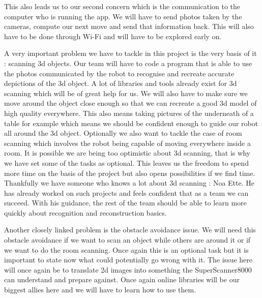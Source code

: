 \documentclass{article}
\begin{document}
This also leads us to our second concern which is the communication to the computer who is running the app. We will have to send photos taken by the cameras, compute our next move and send that information back. This will also have to be done through Wi-Fi and will have to be explored early on.

A very important problem we have to tackle in this project is the very basis of it : scanning 3d objects. Our team will have to code a program that is able to use the photos communicated by the robot to recognise and recreate accurate depictions of the 3d object. A lot of libraries and tools already exist for 3d scanning which will be of great help for us. We will also have to make sure we move around the object close enough so that we can recreate a good 3d model of high quality everywhere. This also means taking pictures of the underneath of a table for example which means we should be confident enough to guide our robot all around the 3d object. Optionally we also want to tackle the case of room scanning which involves the robot being capable of moving everywhere inside a room. It is possible we are being too optimistic about 3d scanning, that is why we have set some of the tasks as optional. This leaves us the freedom to spend more time on the basis of the project but also opens possibilities if we find time. Thankfully we have someone who knows a lot about 3d scanning : Noa Ette. He has already worked on such projects and feels confident that as a team we can succeed. With his guidance, the rest of the team should be able to learn more quickly about recognition and reconstruction basics.

Another closely linked problem is the obstacle avoidance issue. We will need this obstacle avoidance if we want to scan an object while others are around it or if we want to do the room scanning. Once again this is an optional task but it is important to state now what could potentially go wrong with it. The issue here will once again be to translate 2d images into something the SuperScanner8000 can understand and prepare against. Once again online libraries will be our biggest allies here and we will have to learn how to use them.

\printbibliography
\end{document}
